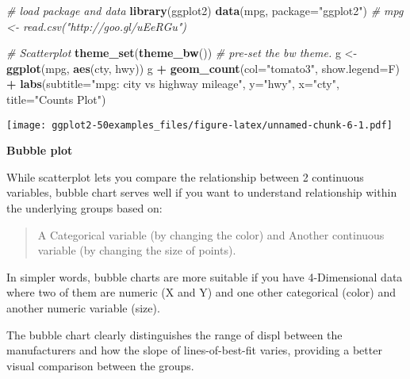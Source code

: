 \documentclass[a4paper]{article}
\newenvironment{Shaded}{\begin{snugshade}}{\end{snugshade}}
\newcommand{\KeywordTok}[1]{\textcolor[rgb]{0.13,0.29,0.53}{\textbf{#1}}}
\newcommand{\DataTypeTok}[1]{\textcolor[rgb]{0.13,0.29,0.53}{#1}}
\newcommand{\StringTok}[1]{\textcolor[rgb]{0.31,0.60,0.02}{#1}}
\newcommand{\CommentTok}[1]{\textcolor[rgb]{0.56,0.35,0.01}{\textit{#1}}}
\newcommand{\OperatorTok}[1]{\textcolor[rgb]{0.81,0.36,0.00}{\textbf{#1}}}
\newcommand{\NormalTok}[1]{#1}
\begin{document}
\begin{Shaded}
\begin{Highlighting}[]
\CommentTok{# load package and data}
\KeywordTok{library}\NormalTok{(ggplot2)}
\KeywordTok{data}\NormalTok{(mpg, }\DataTypeTok{package=}\StringTok{"ggplot2"}\NormalTok{)}
\CommentTok{# mpg <- read.csv("http://goo.gl/uEeRGu")}

\CommentTok{# Scatterplot}
\KeywordTok{theme_set}\NormalTok{(}\KeywordTok{theme_bw}\NormalTok{())  }\CommentTok{# pre-set the bw theme.}
\NormalTok{g <-}\StringTok{ }\KeywordTok{ggplot}\NormalTok{(mpg, }\KeywordTok{aes}\NormalTok{(cty, hwy))}
\NormalTok{g }\OperatorTok{+}\StringTok{ }\KeywordTok{geom_count}\NormalTok{(}\DataTypeTok{col=}\StringTok{"tomato3"}\NormalTok{, }\DataTypeTok{show.legend=}\NormalTok{F) }\OperatorTok{+}
\StringTok{  }\KeywordTok{labs}\NormalTok{(}\DataTypeTok{subtitle=}\StringTok{"mpg: city vs highway mileage"}\NormalTok{, }
       \DataTypeTok{y=}\StringTok{"hwy"}\NormalTok{, }
       \DataTypeTok{x=}\StringTok{"cty"}\NormalTok{, }
       \DataTypeTok{title=}\StringTok{"Counts Plot"}\NormalTok{)}
\end{Highlighting}
\end{Shaded}

\texttt{[image: ggplot2-50examples\_files/figure-latex/unnamed-chunk-6-1.pdf]}
\newpage

\textbf{Bubble plot}

While scatterplot lets you compare the relationship between 2 continuous
variables, bubble chart serves well if you want to understand
relationship within the underlying groups based on:

\begin{quote}
A Categorical variable (by changing the color) and Another continuous
variable (by changing the size of points).
\end{quote}

In simpler words, bubble charts are more suitable if you have
4-Dimensional data where two of them are numeric (X and Y) and one other
categorical (color) and another numeric variable (size).

The bubble chart clearly distinguishes the range of displ between the
manufacturers and how the slope of lines-of-best-fit varies, providing a
better visual comparison between the groups.
\end{document}
